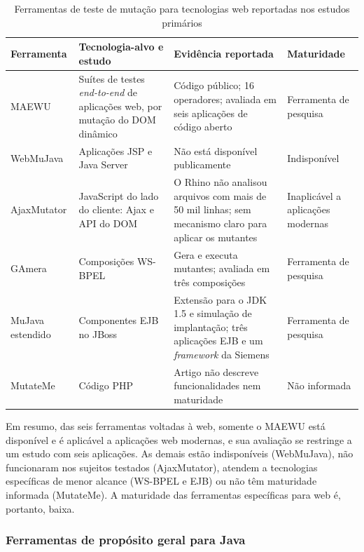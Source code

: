 \begin{table}[H]
    \centering
    \footnotesize
    \caption{Ferramentas de teste de mutação para tecnologias web reportadas nos estudos primários}
    \label{tab:ferramentas-web}
    \begin{tabular}{|p{2.3cm}|p{4.2cm}|p{4.8cm}|p{2.7cm}|}
        \hline
        \textbf{Ferramenta} & \textbf{Tecnologia-alvo e estudo} & \textbf{Evidência reportada} & \textbf{Maturidade} \\
        \hline
        MAEWU & Suítes de testes \textit{end-to-end} de aplicações web, por mutação do DOM dinâmico \cite{yandrapally2021} & Código público; 16 operadores; avaliada em seis aplicações de código aberto & Ferramenta de pesquisa \\
        \hline
        WebMuJava & Aplicações JSP e Java Server \cite{yandrapally2021} & Não está disponível publicamente & Indisponível \\
        \hline
        AjaxMutator & JavaScript do lado do cliente: Ajax e API do DOM \cite{yandrapally2021} & O Rhino não analisou arquivos com mais de 50 mil linhas; sem mecanismo claro para aplicar os mutantes & Inaplicável a aplicações modernas \\
        \hline
        GAmera & Composições WS-BPEL \cite{esterobotaro2010} & Gera e executa mutantes; avaliada em três composições & Ferramenta de pesquisa \\
        \hline
        MuJava estendido & Componentes EJB no JBoss \cite{nica2011} & Extensão para o JDK 1.5 e simulação de implantação; três aplicações EJB e um \textit{framework} da Siemens & Ferramenta de pesquisa \\
        \hline
        MutateMe & Código PHP \cite{belli2011} & Artigo não descreve funcionalidades nem maturidade & Não informada \\
        \hline
    \end{tabular}
\end{table}

Em resumo, das seis ferramentas voltadas à web, somente o MAEWU está disponível e é aplicável a aplicações web modernas, e sua avaliação se restringe a um estudo com seis aplicações. As demais estão indisponíveis (WebMuJava), não funcionaram nos sujeitos testados (AjaxMutator), atendem a tecnologias específicas de menor alcance (WS-BPEL e EJB) ou não têm maturidade informada (MutateMe). A maturidade das ferramentas específicas para web é, portanto, baixa.

\subsubsection{Ferramentas de propósito geral para Java}

